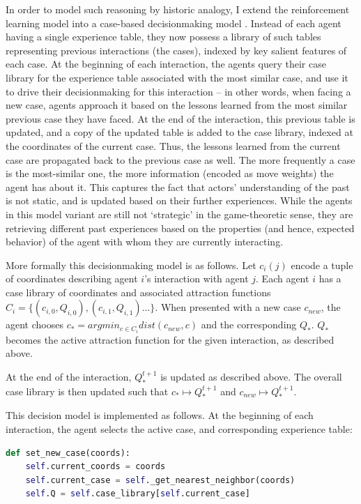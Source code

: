 In order to model such reasoning by historic analogy, I extend the reinforcement learning model into a case-based decisionmaking model \citep{ram_1997,mantaras_2001,jiang_2009}. Instead of each agent having a single experience table, they now possess a library of such tables representing previous interactions (the cases), indexed by key salient features of each case. At the beginning of each interaction, the agents query their case library for the experience table associated with the most similar case, and use it to drive their decisionmaking for this interaction -- in other words, when facing a new case, agents approach it based on the lessons learned from the most similar previous case they have faced. At the end of the interaction, this previous table is updated, and a copy of the updated table is added to the case library, indexed at the coordinates of the current case. Thus, the lessons learned from the current case are propagated back to the previous case as well. The more frequently a case is the most-similar one, the more information (encoded as move weights) the agent has about it. This captures the fact that actors' understanding of the past is not static, and is updated based on their further experiences. While the agents in this model variant are still not `strategic' in the game-theoretic sense, they are retrieving different past experiences based on the properties (and hence, expected behavior) of the agent with whom they are currently interacting.

More formally this decisionmaking model is as follows. Let $c_i(j)$ encode a tuple of coordinates describing agent $i$'s interaction with agent $j$. Each agent $i$ has a case library of coordinates and associated attraction functions $C_i = \{(c_{i,0}, Q_{i,0}), (c_{i,1}, Q_{i,1})... \}$. When presented with a new case $c_{new}$, the agent chooses $c_* = argmin_{c \in C_i} dist(c_{new}, c)$ and the corresponding $Q_*$. $Q_*$ becomes the active attraction function for the given interaction, as described above. 

At the end of the interaction, $Q^{t+1}_*$ is updated as described above. The overall case library is then updated such that $c_* \mapsto Q^{t+1}_*$ and $c_{new} \mapsto Q^{t+1}_*$.

This decision model is implemented as follows. At the beginning of each interaction, the agent selects the active case, and corresponding experience table:

\begin{singlespace}
\begin{lstlisting}[language=python,caption={Case-Based Learning -- Set Case},label={code:cb_setccase}]
def set_new_case(coords):
    self.current_coords = coords
    self.current_case = self._get_nearest_neighbor(coords)
    self.Q = self.case_library[self.current_case]
\end{lstlisting}
\end{singlespace}

